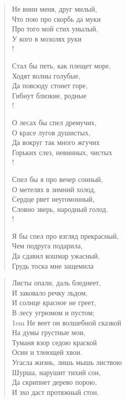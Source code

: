\begin{verse}
\begin{altverse}
Не вини меня, друг милый,\\
    Что пою про скорбь да муки\ldotst\\
Про того мой стих унылый,\\
    У кого в мозолях руки\ldotst\\!

Стал бы петь, как плещет море,\\
    Ходят волны голубые,\\
Да повсюду стонет горе,\\
    Гибнут близкие, родные\ldotst\\!

О лесах бы спел дремучих,\\
    О красе лугов душистых,\\
Да вокруг так много жгучих\\
    Горьких слез, невинных, чистых\ldotst\\!

Спел бы я про вечер сонный,\\
    О метелях в зимний холод,\\
Сердце рвет неугомонный,\\
    Словно зверь, народный голод.\\!

Я бы спел про взгляд прекрасный,\\
    Чем подруга подарила,\\
Да сдавил кошмар ужасный,\\
    Грудь тоска мне защемила\ldotst
\end{altverse}
\end{verse}

\newpage
\vspace*{0cm}

\begin{verse}
Листы опали, даль бледнеет,\\
И заковало речку льдом,\\
И солнце красное не греет,\\
В лесу угрюмом и пустом;\\
\begingroup
\leftskip1em
\rightskip\leftskip
Не веет он волшебной сказкой\\
На думы грустные мои,\\
Туманя взор седою краской\\
Осин и тлеющей хвои.\\
\endgroup
Угасла жизнь, лишь мышь листвою\\
Шурша, нарушит тихий сон,\\
Да скрипнет дерево порою,\\
И эхо даст протяжный стон.
\end{verse}

